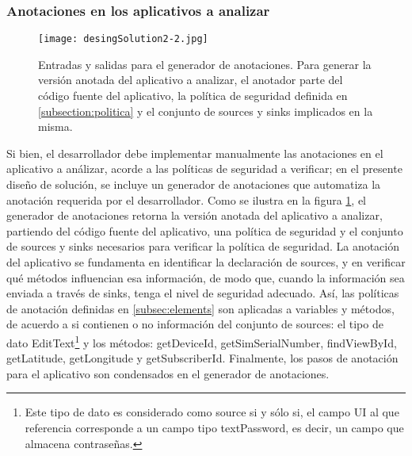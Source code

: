 \subsubsection{Anotaciones en los aplicativos a analizar}
\label{subsec:anotador}
\begin{figure}[t!]
	\begin{center}
	\texttt{[image: desingSolution2-2.jpg]}
	\end{center}
	\caption{Entradas y salidas para el generador de anotaciones.\newline
	Para generar la versión anotada del aplicativo a analizar, el anotador parte
	del código fuente del aplicativo, la política de seguridad definida en
	\ref{subsection:politica} y el conjunto de sources y sinks implicados en la misma.}
	\label{fig:desingSolution}
\end{figure}
Si bien, el desarrollador debe implementar manualmente las anotaciones en el
aplicativo a análizar, acorde a las políticas de seguridad a verificar; en el
presente diseño de solución, se incluye un generador de anotaciones que
automatiza la anotación requerida por el desarrollador. Como se ilustra en la
figura \ref{fig:desingSolution}, el generador de anotaciones retorna la versión
anotada del aplicativo a analizar, partiendo del código fuente del aplicativo,
una política de seguridad y el conjunto de sources y sinks necesarios para
verificar la política de seguridad.\newline
La anotación del aplicativo se fundamenta en identificar la declaración de
sources, y en verificar qué métodos influencian esa información, de modo que,
cuando la información sea enviada a través de sinks, tenga el nivel de seguridad
adecuado. Así, las políticas de anotación definidas en \ref{subsec:elements} son
aplicadas a variables y métodos, de acuerdo a si contienen o no información del
conjunto de sources: el tipo de dato EditText\footnote{Este tipo de
dato es considerado como source si y sólo si, el campo UI al que referencia
corresponde a un campo tipo textPassword, es decir, un campo que almacena
contraseñas.} y los métodos: getDeviceId, getSimSerialNumber, findViewById,
getLatitude, getLongitude y getSubscriberId.
Finalmente, los pasos de anotación para el aplicativo son condensados en el
generador de anotaciones.












